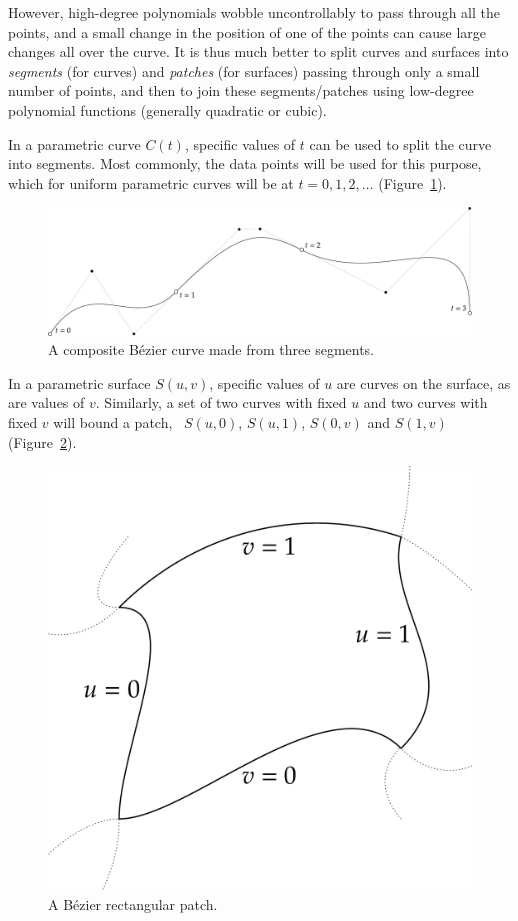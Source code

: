 However, high-degree polynomials wobble uncontrollably to pass through all the points, and a small change in the position of one of the points can cause large changes all over the curve.
It is thus much better to split curves and surfaces into \emph{segments} (for curves) and \emph{patches} (for surfaces) passing through only a small number of points, and then to join these segments/patches using low-degree polynomial functions (generally quadratic or cubic).

In a parametric curve \(C(t)\), specific values of \(t\) can be used to split the curve into segments.
Most commonly, the data points will be used for this purpose, which for uniform parametric curves will be at \(t = 0, 1, 2, \ldots \) (Figure~\ref{fig:segments}).

\begin{figure}
\centering
\includegraphics[width=\linewidth]{figs/segments}
\caption{A composite B\'ezier curve made from three segments.}%
\label{fig:segments}
\end{figure}

In a parametric surface \(S(u, v)\), specific values of \(u\) are curves on the surface, as are values of \(v\).
Similarly, a set of two curves with fixed \(u\) and two curves with fixed \(v\) will bound a patch, \eg\ \(S(u, 0)\), \(S(u, 1)\), \(S(0, v)\) and \(S(1, v)\) (Figure~\ref{fig:patch}).

\begin{figure}
\centering
\includegraphics[width=0.5\linewidth]{figs/patch}
\caption{A B\'ezier rectangular patch.}%
\label{fig:patch}
\end{figure}

